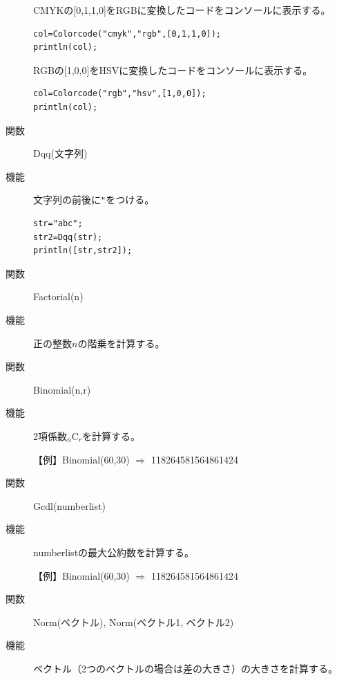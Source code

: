 \documentclass[papersize,a4paper,12pt,uplatex]{jsarticle}
\begin{document}
\begin{description}
CMYKの[0,1,1,0]をRGBに変換したコードをコンソールに表示する。

\begin{verbatim}
col=Colorcode("cmyk","rgb",[0,1,1,0]);
println(col); 
\end{verbatim}

RGBの[1,0,0]をHSVに変換したコードをコンソールに表示する。

\begin{verbatim}
col=Colorcode("rgb","hsv",[1,0,0]);
println(col); 
\end{verbatim}

\vspace{\baselineskip}
\hypertarget{dqq}{}
\item[関数]Dqq(文字列)
\item[機能]文字列の前後に\verb|"|をつける。
\begin{verbatim}
str="abc";
str2=Dqq(str);
println([str,str2]); 
\end{verbatim}

\vspace{\baselineskip}

\hypertarget{factorial}{}
\item[関数]Factorial(n)
\item[機能]正の整数$n$の階乗を計算する。

\vspace{\baselineskip}

\hypertarget{binomial}{}
\item[関数]Binomial(n,r)
\item[機能]2項係数${}_n\mathrm{C}_r$を計算する。

\vspace{\baselineskip}
【例】Binomial(60,30) $\Rightarrow$ 118264581564861424

\vspace{\baselineskip}

\hypertarget{gcd}{}
\item[関数]Gcdl(numberlist)
\item[機能]numberlistの最大公約数を計算する。

\vspace{\baselineskip}
【例】Binomial(60,30) $\Rightarrow$ 118264581564861424

\vspace{\baselineskip}

\hypertarget{norm}{}
\item[関数]Norm(ベクトル), Norm(ベクトル1, ベクトル2)
\item[機能]ベクトル（2つのベクトルの場合は差の大きさ）の大きさを計算する。


\end{description}
\end{document}
